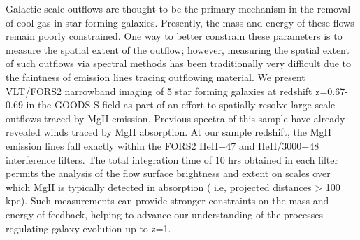 


Galactic-scale outflows are thought to be the primary mechanism in the removal of cool gas in star-forming galaxies. Presently, the mass and energy of these flows remain poorly constrained. One way to better constrain these parameters is to measure the spatial extent of the outflow; however, measuring the spatial extent of such outflows via spectral methods has been traditionally very difficult due to the faintness of emission lines tracing outflowing material. We present VLT/FORS2 narrowband imaging of 5 star forming galaxies at redshift z=0.67-0.69 in the GOODS-S field as part of an effort to spatially resolve large-scale outflows traced by MgII emission. Previous spectra of this sample have already revealed winds traced by MgII absorption. At our sample redshift, the MgII emission lines fall exactly within the FORS2 HeII+47 and HeII/3000+48 interference filters. The total integration time of 10 hrs obtained in each filter permits the analysis of the flow surface brightness and extent on scales over which MgII is typically detected in absorption ( i.e, projected distances > 100 kpc). Such measurements can provide stronger constraints on the mass and energy of feedback, helping to advance our understanding of the processes regulating galaxy evolution up to z=1. 

